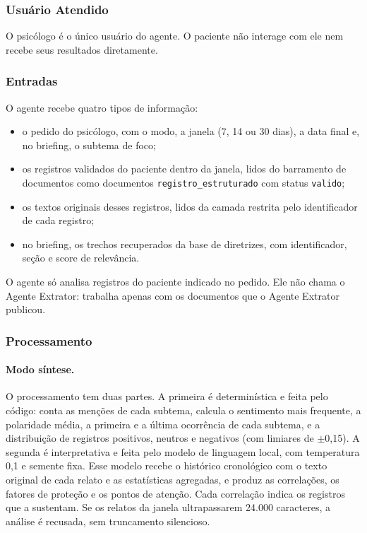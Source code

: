 \documentclass[12pt,a4paper]{article}
\begin{document}
\subsubsection{Usuário Atendido}
O psicólogo é o único usuário do agente. O paciente não interage com ele nem recebe seus resultados diretamente.

\subsubsection{Entradas}
O agente recebe quatro tipos de informação:
\begin{itemize}
  \item o pedido do psicólogo, com o modo, a janela (7, 14 ou 30 dias), a data final e, no briefing, o subtema de foco;
  \item os registros validados do paciente dentro da janela, lidos do barramento de documentos como documentos \texttt{registro\_estruturado} com status \texttt{valido};
  \item os textos originais desses registros, lidos da camada restrita pelo identificador de cada registro;
  \item no briefing, os trechos recuperados da base de diretrizes, com identificador, seção e score de relevância.
\end{itemize}
O agente só analisa registros do paciente indicado no pedido. Ele não chama o Agente Extrator: trabalha apenas com os documentos que o Agente Extrator publicou.

\subsubsection{Processamento}
\paragraph{Modo síntese.} O processamento tem duas partes. A primeira é determinística e feita pelo código: conta as menções de cada subtema, calcula o sentimento mais frequente, a polaridade média, a primeira e a última ocorrência de cada subtema, e a distribuição de registros positivos, neutros e negativos (com limiares de $\pm$0,15). A segunda é interpretativa e feita pelo modelo de linguagem local, com temperatura 0,1 e semente fixa. Esse modelo recebe o histórico cronológico com o texto original de cada relato e as estatísticas agregadas, e produz as correlações, os fatores de proteção e os pontos de atenção. Cada correlação indica os registros que a sustentam. Se os relatos da janela ultrapassarem 24.000 caracteres, a análise é recusada, sem truncamento silencioso.
\end{document}
